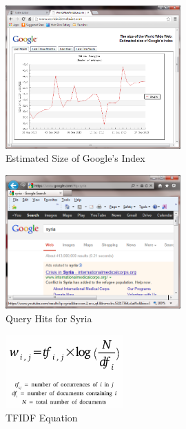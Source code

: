 \documentclass[letterpaper,11pt]{report}
\begin{document}
\begin{savenotes}
\begin{figure}[htbp]
	\centering
		\includegraphics[width=0.60\textwidth]{GoogleEstimatedSize.png}
	\caption{Estimated Size of Google's Index}
	\label{fig:GoogleEstimatedSize}
\end{figure}

\begin{figure}[htbp]
	\centering
		\includegraphics[width=0.60\textwidth]{SyriaQueryHitsGoogle.png}
	\caption{Query Hits for Syria}
	\label{fig:SyriaQueryHitsGoogle}
\end{figure}

\begin{figure}[htbp]
	\centering
		\includegraphics[width=0.40\textwidth]{tfidf.png}
	\caption{TFIDF Equation}
	\label{fig:tfidf}
\end{figure}


\end{savenotes}
\end{document}
